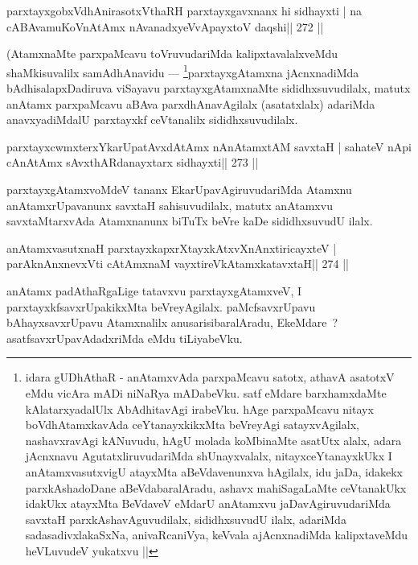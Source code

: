 \begin{shl}
parxtayxgobxVdhAnirasotxV\s thaRH parxtayxgavxnanx hi sidhayxti |
na cABAvamuKoV\s nAtAmx nAvanadxyeVvApayxtoV daqshi\hfill || 272 ||
\end{shl}

\begin{artha}
(AtamxnaMte parxpaMcavu toVruvudariMda kalipxtavalalxveMdu shaMkisuvalilx samAdhAnavidu {\rm ---}  \footnote{idara gUDhAthaR - anAtamxvAda parxpaMcavu satotx, athavA asatotxV eMdu vicAra mADi niNaRya mADabeVku. satf eMdare barxhamxdaMte kAlatarxyadalUlx AbAdhitavAgi irabeVku. hAge parxpaMcavu nitayx boVdhAtamxkavAda ceYtanayxkikxMta beVreyAgi satayxvAgilalx, nashavxravAgi kANuvudu, hAgU molada koMbinaMte asatUtx alalx, adara jAcnxnavu AgutatxliruvudariMda shUnayxvalalx, nitayxceYtanayxkUkx I anAtamxvasutxvigU atayxMta aBeVdavenunxva hAgilalx, idu jaDa, idakekx parxkAshadoDane aBeVdabaralAradu, ashavx mahiSagaLaMte ceVtanakUkx idakUkx atayxMta BeVdaveV eMdarU anAtamxvu jaDavAgiruvudariMda savxtaH parxkAshavAguvudilalx, sididhxsuvudU ilalx, adariMda sadasadivxlakaSxNa, anivaRcaniVya, keVvala ajAcnxnadiMda kalipxtaveMdu heVLuvudeV yukatxvu ||}parxtayxgAtamxna jAcnxnadiMda bAdhisalapxDadiruva viSayavu parxtayxgAtamxnaMte sididhxsuvudilalx, matutx anAtamx parxpaMcavu aBAva parxdhAnavAgilalx (asatatxlalx) adariMda anavxyadiMdalU parxtayxkf ceVtanalilx sididhxsuvudilalx.
\end{artha}


\begin{shl}
parxtayxcwmxterxYkarUpatAvxdAtAmx nAnAtamxtAM savxtaH |
sahateV nApi cAnAtAmx sAvxthARdanayxtarx sidhayxti\hfill || 273 ||
\end{shl}

\begin{artha}
parxtayxgAtamxvoMdeV tananx EkarUpavAgiruvudariMda Atamxnu anAtamxrUpavanunx savxtaH sahisuvudilalx, matutx anAtamxvu savxtaMtarxvAda Atamxnanunx biTuTx beVre kaDe sididhxsuvudU ilalx.
\end{artha}

\begin{shl}
anAtamxvasutxnaH parxtayxkapxrXtayxkAtxvXnAnxtiricayxteV |
parAknAnxnevxVti cA\s\s tAmxnaM vayxtireVkAtamxkatavxtaH\hfill || 274 ||
\end{shl}

\begin{artha}
anAtamx padAthaRgaLige tatavxvu parxtayxgAtamxveV, I parxtayxkfsavxrUpakikxMta beVreyAgilalx. paMcfsavxrUpavu bAhayxsavxrUpavu Atamxnalilx anusarisibaralAradu, EkeMdare~? asatfsavxrUpavAdadxriMda eMdu tiLiyabeVku.
\end{artha}

